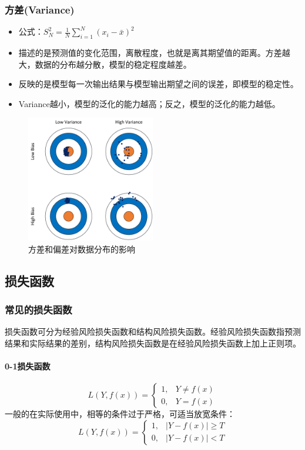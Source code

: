 \documentclass[UTF8]{ctexart}
\begin{document}
\subsubsection{方差(Variance)}
\begin{itemize}
	\item 公式：$S_{N}^{2}=\frac{1}{N}\sum_{i=1}^{N}(x_{i}-\bar{x})^{2}$
	\item 描述的是预测值的变化范围，离散程度，也就是离其期望值的距离。方差越大，数据的分布越分散，模型的稳定程度越差。
	\item 反映的是模型每一次输出结果与模型输出期望之间的误差，即模型的稳定性。
	\item Variance越小，模型的泛化的能力越高；反之，模型的泛化的能力越低。
\end{itemize}
\begin{figure}[htb]
	\centering
	\includegraphics[width=0.5\textwidth]{figures/error1.png}
	\caption{方差和偏差对数据分布的影响}
	\label{error1}
\end{figure}


\subsection{损失函数}
\subsubsection{常见的损失函数}
损失函数可分为经验风险损失函数和结构风险损失函数。经验风险损失函数指预测结果和实际结果的差别，结构风险损失函数是在经验风险损失函数上加上正则项。
\paragraph{0-1损失函数}
$$L(Y, f(x)) =
\begin{cases}
1,& Y\ne f(x)\\
0,& Y = f(x)
\end{cases}$$
一般的在实际使用中，相等的条件过于严格，可适当放宽条件：
$$L(Y, f(x)) =
\begin{cases}
1,& |Y-f(x)| \geq T\\
0,& |Y-f(x)|< T
\end{cases}$$
\end{document}
